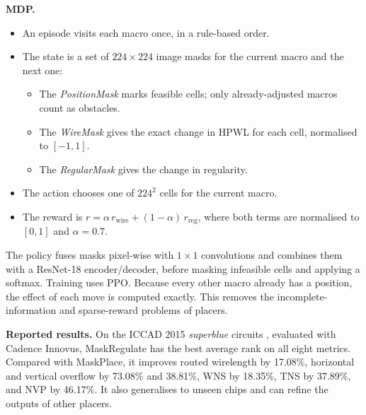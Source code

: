 \documentclass{article}
\begin{document}
\textbf{MDP.}
\begin{itemize}
  \item An episode visits each macro once, in a rule-based order.
  \item The state is a set of $224\times224$ image masks for the current macro and the next one:
  \begin{itemize}
    \item The \emph{PositionMask} marks feasible cells; only already-adjusted macros count as obstacles.
    \item The \emph{WireMask} gives the exact change in HPWL for each cell, normalised to $[-1,1]$.
    \item The \emph{RegularMask} gives the change in regularity.
  \end{itemize}
  \item The action chooses one of $224^2$ cells for the current macro.
  \item The reward is $r=\alpha\,r_{\mathrm{wire}}+(1-\alpha)\,r_{\mathrm{reg}}$, where both terms are
  normalised to $[0,1]$ and $\alpha=0.7$.
\end{itemize}
The policy fuses masks pixel-wise with $1\times1$ convolutions and combines them with a ResNet-18
encoder/decoder, before masking infeasible cells and applying a softmax. Training uses PPO. Because every
other macro already has a position, the effect of each move is computed exactly. This removes the
incomplete-information and sparse-reward problems of placers.

\textbf{Reported results.} On the ICCAD 2015 \emph{superblue} circuits \citep{kim2015iccad}, evaluated
with Cadence Innovus, MaskRegulate has the best average rank on all eight metrics. Compared with
MaskPlace, it improves routed wirelength by 17.08\%, horizontal and vertical overflow by 73.08\% and
38.81\%, WNS by 18.35\%, TNS by 37.89\%, and NVP by 46.17\%. It also generalises to unseen chips and
can refine the outputs of other placers.
\end{document}
